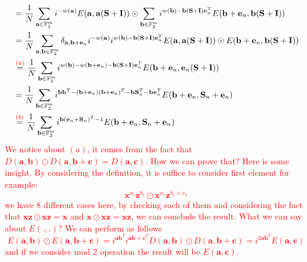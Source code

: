 \documentclass{article}
\begin{document}
	\begin{align*}
		&=\frac{1}{N} \sum_{\mathbf{a}\in \mathbb{F}_2^m} i^{-w(\mathbf{a})} E(\mathbf{a}, \mathbf{a}(\mathbf{S} + \mathbf{I})) \odot \sum_{\mathbf{b}\in \mathbb{F}_2^m} i^{w(\mathbf{b}) - \mathbf{b}(\mathbf{S} + \mathbf{I})\mathbf{e}_n^T} E(\mathbf{b} + \mathbf{e}_n, \mathbf{b}(\mathbf{S} + \mathbf{I})) \\
		 &=\frac{1}{N}\sum_{\mathbf{a},\mathbf{b}\in \mathbb{F}_2^m} \delta_{\mathbf{a}, \mathbf{b} + \mathbf{e}_n} i^{-w(\mathbf{a})} i^{w(\mathbf{b})-\mathbf{b}(\mathbf{S}+\mathbf{I})\mathbf{e}_n^T} E(\mathbf{a}, \mathbf{a}(\mathbf{S}+\mathbf{I})) \odot E(\mathbf{b} + \mathbf{e}_n, \mathbf{b}(\mathbf{S}+\mathbf{I})) \\
		&\stackrel{\textcolor{red}{(a)}}{=}\frac{1}{N}\sum_{\mathbf{b}\in \mathbb{F}_2^m} i^{w(\mathbf{b})-w(\mathbf{b}+\mathbf{e}_n)-\mathbf{b}(\mathbf{S}+\mathbf{I})\mathbf{e}_n^T}E(\mathbf{b} + \mathbf{e}_n, \mathbf{e}_n(\mathbf{S}+\mathbf{I}))   \\
		&=\frac{1}{N} \sum_{ \mathbf{b}\in \mathbb{F}_2^m } i^{\mathbf{b}\mathbf{b}^T - (\mathbf{b}+\mathbf{e}_n)(\mathbf{b}+\mathbf{e}_n)^T - \mathbf{b}\mathbf{S}_n^T - \mathbf{b}\mathbf{e}_n^T}E(\mathbf{b}+\mathbf{e}_n, \mathbf{S}_n + \mathbf{e}_n)  \\ 
		&\stackrel{\textcolor{red}{(b)}}{=}\frac{1}{N} \sum_{\mathbf{b}\in \mathbb{F}_2^m} i^{\mathbf{b}(\mathbf{e}_n + \mathbf{S}_n)^T - 1}E(\mathbf{b}+\mathbf{e}_n,\mathbf{S}_n+\mathbf{e}_n)
	\end{align*}
\textcolor{red}{
	We notice about $(a)$, it comes from the fact that $D(\mathbf{a, b}) \odot D(\mathbf{a, b+c})=D(\mathbf{a, c})$. How we can prove that? Here is some insight. By considering the definition, it is suffice to consider first element for example:
	\begin{equation*}
		\mathbf{x}^{a_1}\mathbf{z}^{b_1} \odot \mathbf{x}^{a_1}\mathbf{z}^{b_1+c_1}
	\end{equation*}
we have 8 different cases here, by checking each of them and considering the fact that $\mathbf{x}\mathbf{z}\odot \mathbf{x}\mathbf{z} = \mathbf{x}$ and $\mathbf{x}\odot \mathbf{x}\mathbf{z} = \mathbf{x}\mathbf{z}$, we can conclude the result. What we can say about $E(.,.)$? We can perform as follows
\begin{equation*}
	E(\mathbf{a,b}) \odot E(\mathbf{a,b+c}) = i^{\mathbf{a}\mathbf{b}^T}i^{\mathbf{a}\mathbf{b+c}^T}D(\mathbf{a,b}) \odot D(\mathbf{a,b+c}) = i^{2\mathbf{a}\mathbf{b}^T} E(\mathbf{a,c})
\end{equation*}
and if we consider mod 2 operation the result will be $E(\mathbf{a,c})$.
}
\end{document}
